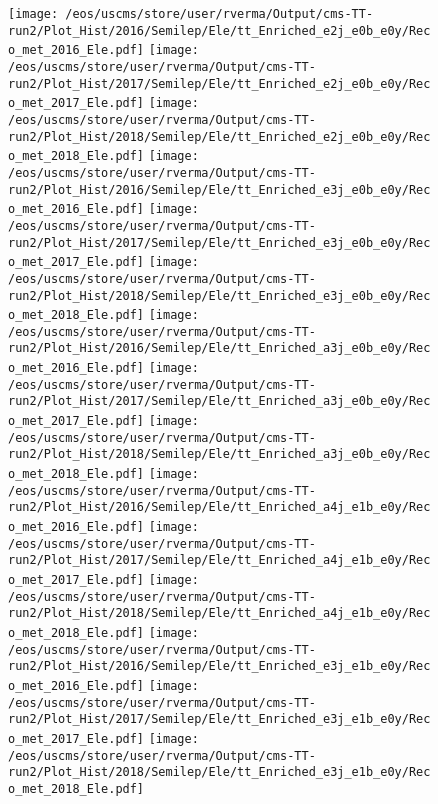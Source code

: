 \begin{figure}
\centering
\texttt{[image: /eos/uscms/store/user/rverma/Output/cms-TT-run2/Plot\_Hist/2016/Semilep/Ele/tt\_Enriched\_e2j\_e0b\_e0y/Reco\_met\_2016\_Ele.pdf]}
\texttt{[image: /eos/uscms/store/user/rverma/Output/cms-TT-run2/Plot\_Hist/2017/Semilep/Ele/tt\_Enriched\_e2j\_e0b\_e0y/Reco\_met\_2017\_Ele.pdf]}
\texttt{[image: /eos/uscms/store/user/rverma/Output/cms-TT-run2/Plot\_Hist/2018/Semilep/Ele/tt\_Enriched\_e2j\_e0b\_e0y/Reco\_met\_2018\_Ele.pdf]}
\texttt{[image: /eos/uscms/store/user/rverma/Output/cms-TT-run2/Plot\_Hist/2016/Semilep/Ele/tt\_Enriched\_e3j\_e0b\_e0y/Reco\_met\_2016\_Ele.pdf]}
\texttt{[image: /eos/uscms/store/user/rverma/Output/cms-TT-run2/Plot\_Hist/2017/Semilep/Ele/tt\_Enriched\_e3j\_e0b\_e0y/Reco\_met\_2017\_Ele.pdf]}
\texttt{[image: /eos/uscms/store/user/rverma/Output/cms-TT-run2/Plot\_Hist/2018/Semilep/Ele/tt\_Enriched\_e3j\_e0b\_e0y/Reco\_met\_2018\_Ele.pdf]}
\texttt{[image: /eos/uscms/store/user/rverma/Output/cms-TT-run2/Plot\_Hist/2016/Semilep/Ele/tt\_Enriched\_a3j\_e0b\_e0y/Reco\_met\_2016\_Ele.pdf]}
\texttt{[image: /eos/uscms/store/user/rverma/Output/cms-TT-run2/Plot\_Hist/2017/Semilep/Ele/tt\_Enriched\_a3j\_e0b\_e0y/Reco\_met\_2017\_Ele.pdf]}
\texttt{[image: /eos/uscms/store/user/rverma/Output/cms-TT-run2/Plot\_Hist/2018/Semilep/Ele/tt\_Enriched\_a3j\_e0b\_e0y/Reco\_met\_2018\_Ele.pdf]}
\texttt{[image: /eos/uscms/store/user/rverma/Output/cms-TT-run2/Plot\_Hist/2016/Semilep/Ele/tt\_Enriched\_a4j\_e1b\_e0y/Reco\_met\_2016\_Ele.pdf]}
\texttt{[image: /eos/uscms/store/user/rverma/Output/cms-TT-run2/Plot\_Hist/2017/Semilep/Ele/tt\_Enriched\_a4j\_e1b\_e0y/Reco\_met\_2017\_Ele.pdf]}
\texttt{[image: /eos/uscms/store/user/rverma/Output/cms-TT-run2/Plot\_Hist/2018/Semilep/Ele/tt\_Enriched\_a4j\_e1b\_e0y/Reco\_met\_2018\_Ele.pdf]}
\texttt{[image: /eos/uscms/store/user/rverma/Output/cms-TT-run2/Plot\_Hist/2016/Semilep/Ele/tt\_Enriched\_e3j\_e1b\_e0y/Reco\_met\_2016\_Ele.pdf]}
\texttt{[image: /eos/uscms/store/user/rverma/Output/cms-TT-run2/Plot\_Hist/2017/Semilep/Ele/tt\_Enriched\_e3j\_e1b\_e0y/Reco\_met\_2017\_Ele.pdf]}
\texttt{[image: /eos/uscms/store/user/rverma/Output/cms-TT-run2/Plot\_Hist/2018/Semilep/Ele/tt\_Enriched\_e3j\_e1b\_e0y/Reco\_met\_2018\_Ele.pdf]}
\end{figure}

